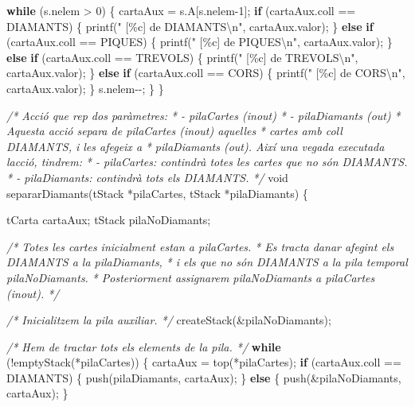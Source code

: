 \documentclass[]{book}
\newenvironment{Shaded}{\begin{snugshade}}{\end{snugshade}}
\newcommand{\CommentTok}[1]{\textcolor[rgb]{0.56,0.35,0.01}{\textit{#1}}}
\newcommand{\ControlFlowTok}[1]{\textcolor[rgb]{0.13,0.29,0.53}{\textbf{#1}}}
\newcommand{\DataTypeTok}[1]{\textcolor[rgb]{0.13,0.29,0.53}{#1}}
\newcommand{\DecValTok}[1]{\textcolor[rgb]{0.00,0.00,0.81}{#1}}
\newcommand{\NormalTok}[1]{#1}
\newcommand{\SpecialCharTok}[1]{\textcolor[rgb]{0.00,0.00,0.00}{#1}}
\newcommand{\StringTok}[1]{\textcolor[rgb]{0.31,0.60,0.02}{#1}}
\begin{document}
\begin{Shaded}
\begin{Highlighting}[]
    \ControlFlowTok{while}\NormalTok{ (s.nelem \textgreater{} }\DecValTok{0}\NormalTok{) \{}
\NormalTok{        cartaAux = s.A[s.nelem{-}}\DecValTok{1}\NormalTok{]; }
        \ControlFlowTok{if}\NormalTok{ (cartaAux.coll == DIAMANTS) \{}
\NormalTok{            printf(}\StringTok{"  [\%c] de DIAMANTS}\SpecialCharTok{\textbackslash{}n}\StringTok{"}\NormalTok{, cartaAux.valor);}
\NormalTok{        \} }\ControlFlowTok{else} \ControlFlowTok{if}\NormalTok{ (cartaAux.coll == PIQUES) \{}
\NormalTok{            printf(}\StringTok{"  [\%c] de PIQUES}\SpecialCharTok{\textbackslash{}n}\StringTok{"}\NormalTok{, cartaAux.valor);}
\NormalTok{        \} }\ControlFlowTok{else} \ControlFlowTok{if}\NormalTok{ (cartaAux.coll == TREVOLS) \{}
\NormalTok{            printf(}\StringTok{"  [\%c] de TREVOLS}\SpecialCharTok{\textbackslash{}n}\StringTok{"}\NormalTok{, cartaAux.valor);}
\NormalTok{        \} }\ControlFlowTok{else} \ControlFlowTok{if}\NormalTok{ (cartaAux.coll == CORS) \{}
\NormalTok{            printf(}\StringTok{"  [\%c] de CORS}\SpecialCharTok{\textbackslash{}n}\StringTok{"}\NormalTok{, cartaAux.valor);}
\NormalTok{        \}}
\NormalTok{        s.nelem{-}{-};}
\NormalTok{    \}}
\NormalTok{\}}

\CommentTok{/* Acció que rep dos paràmetres:}
\CommentTok{ * {-} pilaCartes (inout)}
\CommentTok{ * {-} pilaDiamants (out)}
\CommentTok{ * Aquesta acció separa de pilaCartes (inout) aquelles}
\CommentTok{ * cartes amb coll DIAMANTS, i les afegeix a}
\CommentTok{ * pilaDiamants (out). Així una vegada executada l\textquotesingle{}acció, tindrem:}
\CommentTok{ * {-} pilaCartes: contindrà totes les cartes que no són DIAMANTS.}
\CommentTok{ * {-} pilaDiamants: contindrà tots els DIAMANTS. }
\CommentTok{ */}
\DataTypeTok{void}\NormalTok{ separarDiamants(tStack *pilaCartes, tStack *pilaDiamants) \{}
    
\NormalTok{    tCarta cartaAux;}
\NormalTok{    tStack pilaNoDiamants;}
    
    \CommentTok{/* Totes les cartes inicialment estan a pilaCartes.}
\CommentTok{     * Es tracta d\textquotesingle{}anar afegint els DIAMANTS a la pilaDiamants,}
\CommentTok{     * i els que no són DIAMANTS a la pila temporal pilaNoDiamants.}
\CommentTok{     * Posteriorment assignarem pilaNoDiamants a pilaCartes (inout).}
\CommentTok{     */}
    
    \CommentTok{/* Inicialitzem la pila auxiliar. */}
\NormalTok{    createStack(\&pilaNoDiamants);}
    
    \CommentTok{/* Hem de tractar tots els elements de la pila. */}
    \ControlFlowTok{while}\NormalTok{ (!emptyStack(*pilaCartes)) \{}
\NormalTok{        cartaAux = top(*pilaCartes);}
        \ControlFlowTok{if}\NormalTok{ (cartaAux.coll == DIAMANTS) \{}
\NormalTok{            push(pilaDiamants, cartaAux);}
\NormalTok{        \} }\ControlFlowTok{else}\NormalTok{ \{}
\NormalTok{            push(\&pilaNoDiamants, cartaAux);            }
\NormalTok{        \}}
        

\end{Highlighting}
\end{Shaded}
\end{document}
